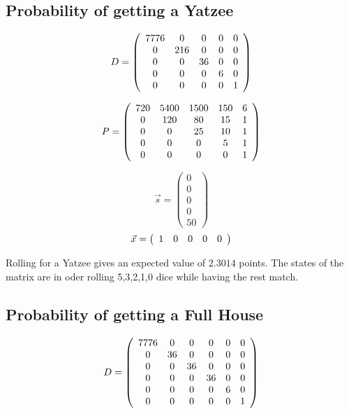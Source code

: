 \subsection{Probability of getting a Yatzee}

\[
D=
\left(
\begin{array}{c c c c c c}
7776& 0 	&0	&0	&0\\
0 	& 216	&0	&0	&0\\
0 	&0		&36	&0	&0\\
0 	&0		&0	&6	&0\\
0 	&0		&0	&0	&1
\end{array}
\right)
\]

\[
P=
\left(
\begin{array}{c c c c c}
720 & 5400 & 1500 & 150 & 6 \\
0 & 120 & 80 & 15 & 1 \\
0 & 0 & 25 & 10 & 1 \\
0 & 0 & 0 & 5 & 1 \\
0 & 0 & 0 & 0 & 1
\end{array}
\right)
\]

\[
\vec{s}=
\left(
\begin{array}{c}
0\\
0\\
0\\
0\\
50
\end{array}
\right)
\]
\[
\vec{x}=
\left(
\begin{array}{c c c c c}
1&0&0&0&0
\end{array}
\right)
\]

Rolling for a Yatzee gives an expected value of $2.3014$ points. The states of
the matrix are in oder rolling 5,3,2,1,0 dice while having the rest match.

\subsection{Probability of getting a Full House}

\[
D=
\left(
\begin{array}{c c c c c c}

7776&0	& 0 	& 0		&0	&0\\
0	&36	& 0 	& 0		&0	&0\\
0 	&0	& 36	& 0		&0	&0\\
0 	&0	& 0		& 36	&0	&0\\
0 	&0	& 0		& 0		&6	&0\\
0 	&0	& 0		& 0		&0	&1
\end{array}
\right)
\]


